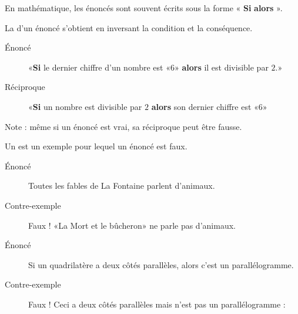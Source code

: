 
En mathématique, les énoncés sont souvent écrits sous la forme « {\bf Si}  {\bf alors} ».

\begin{definition}
    La  d'un énoncé s'obtient en inversant la condition et la conséquence.
\end{definition}

\begin{example}
    \begin{description}
        \item[Énoncé] «{\bf Si} le dernier chiffre d'un nombre est «\( 6\)» {\bf alors} il est divisible par \( 2\).» 
        \item[Réciproque] «{\bf Si} un nombre est divisible par \( 2\) {\bf alors} son dernier chiffre est «\( 6\)» 
    \end{description}
    Note : même si un énoncé est vrai, sa réciproque peut être fausse.
\end{example}

\begin{definition}
    Un  est un exemple pour lequel un énoncé est faux.
\end{definition}

\begin{example}
    \begin{description}
        \item[Énoncé] Toutes les fables de La Fontaine parlent d'animaux.
        \item[Contre-exemple] Faux ! «La Mort et le bûcheron» ne parle pas d'animaux.
    \end{description}
\end{example}

\begin{example}
    \begin{description}
        \item[Énoncé] Si un quadrilatère a deux côtés parallèles, alors c'est un parallélogramme.
        \item[Contre-exemple] Faux ! Ceci a deux côtés parallèles mais n'est pas un parallélogramme :
            \begin{center}
               
            \end{center}
    \end{description}
\end{example}

